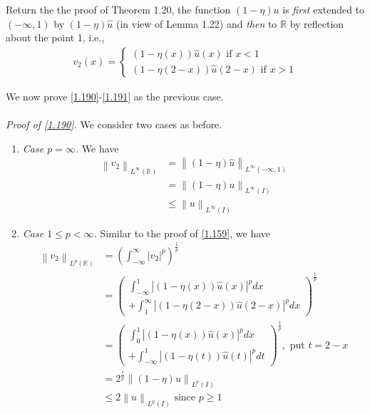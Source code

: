 \documentclass[a4paper,oneside]{book}
\numberwithin{equation}{chapter}
\begin{document}
Return the the proof of Theorem 1.20, the function $\left(1-\eta \right)u$ is \textit{first} extended to $\left(-\infty,1\right)$ by $\left(1-\eta \right)\hat u$ (in view of Lemma 1.22) and \textit{then} to $\mathbb{R}$ by reflection about the point 1, i.e.,
\begin{align}
{v_2}\left( x \right) = \left\{ {\begin{array}{*{20}{c}}
{\left( {1 - \eta \left( x \right)} \right)\hat u\left( x \right)\mbox{ if } x < 1}\\
{\left( {1 - \eta \left( {2 - x} \right)} \right)\hat u\left( {2 - x} \right)\mbox{ if } x > 1}
\end{array}} \right.
\end{align}

We now prove \eqref{1.190}-\eqref{1.191} as the previous case.\\
\\
\textit{Proof of \eqref{1.190}.} We consider two cases as before.
\begin{enumerate}
\item \textit{Case $p=\infty$.} We have
\begin{align}
{\left\| {{v_2}} \right\|_{{L^\infty }\left( \mathbb{R} \right)}} &= {\left\| {\left( {1 - \eta } \right)\hat u} \right\|_{{L^\infty }\left( { - \infty ,1} \right)}}\\
 &= {\left\| {\left( {1 - \eta } \right)u} \right\|_{{L^\infty }\left( I \right)}}\\
 &\le {\left\| u \right\|_{{L^\infty }\left( I \right)}}
\end{align}
\item \textit{Case $1\le p<\infty$.} Similar to the proof of \eqref{1.159}, we have
\begin{align}
{\left\| {{v_2}} \right\|_{{L^p}\left( \mathbb{R} \right)}} &= {\left( {\int_{ - \infty }^\infty  {{{\left| {{v_2}} \right|}^p}} } \right)^{\frac{1}{p}}}\\
& = {\left( \begin{array}{l}
\int_{ - \infty }^1 {{{\left| {\left( {1 - \eta \left( x \right)} \right)\hat u\left( x \right)} \right|}^p}dx} \\
 + \int_1^\infty  {{{\left| {\left( {1 - \eta \left( {2 - x} \right)} \right)\hat u\left( {2 - x} \right)} \right|}^p}dx} 
\end{array} \right)^{\frac{1}{p}}}\\
& = {\left( \begin{array}{l}
\int_0^1 {{{\left| {\left( {1 - \eta \left( x \right)} \right)\hat u\left( x \right)} \right|}^p}dx} \\
 + \int_{ - \infty }^1 {{{\left| {\left( {1 - \eta \left( t \right)} \right)\hat u\left( t \right)} \right|}^p}dt} 
\end{array} \right)^{\frac{1}{p}}},\mbox{ put } t = 2 - x\\
& = {2^{\frac{1}{p}}}{\left\| {\left( {1 - \eta } \right)u} \right\|_{{L^p}\left( I \right)}}\\
& \le 2{\left\| u \right\|_{{L^p}\left( I \right)}}\mbox{ since } p \ge 1
\end{align}
\end{enumerate}
\end{document}
